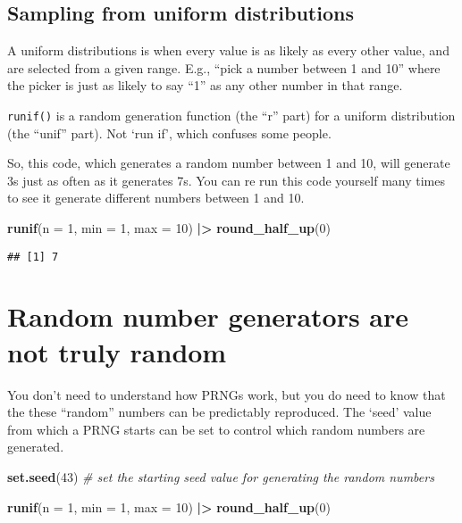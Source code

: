 \documentclass[
]{article}
\newenvironment{Shaded}{\begin{snugshade}}{\end{snugshade}}
\newcommand{\AttributeTok}[1]{\textcolor[rgb]{0.13,0.29,0.53}{#1}}
\newcommand{\CommentTok}[1]{\textcolor[rgb]{0.56,0.35,0.01}{\textit{#1}}}
\newcommand{\DecValTok}[1]{\textcolor[rgb]{0.00,0.00,0.81}{#1}}
\newcommand{\FunctionTok}[1]{\textcolor[rgb]{0.13,0.29,0.53}{\textbf{#1}}}
\newcommand{\NormalTok}[1]{#1}
\newcommand{\SpecialCharTok}[1]{\textcolor[rgb]{0.81,0.36,0.00}{\textbf{#1}}}
\begin{document}
\hypertarget{sampling-from-uniform-distributions}{%
\subsection{Sampling from uniform
distributions}\label{sampling-from-uniform-distributions}}

A uniform distributions is when every value is as likely as every other
value, and are selected from a given range. E.g., ``pick a number
between 1 and 10'' where the picker is just as likely to say ``1'' as
any other number in that range.

\texttt{runif()} is a random generation function (the ``r'' part) for a
uniform distribution (the ``unif'' part). Not `run if', which confuses
some people.

So, this code, which generates a random number between 1 and 10, will
generate 3s just as often as it generates 7s. You can re run this code
yourself many times to see it generate different numbers between 1 and
10.

\begin{Shaded}
\begin{Highlighting}[]
\FunctionTok{runif}\NormalTok{(}\AttributeTok{n =} \DecValTok{1}\NormalTok{, }
      \AttributeTok{min =} \DecValTok{1}\NormalTok{,}
      \AttributeTok{max =} \DecValTok{10}\NormalTok{) }\SpecialCharTok{|\textgreater{}}
  \FunctionTok{round\_half\_up}\NormalTok{(}\DecValTok{0}\NormalTok{)}
\end{Highlighting}
\end{Shaded}

\begin{verbatim}
## [1] 7
\end{verbatim}

\hypertarget{random-number-generators-are-not-truly-random}{%
\section{Random number generators are not truly
random}\label{random-number-generators-are-not-truly-random}}

You don't need to understand how PRNGs work, but you do need to know
that the these ``random'' numbers can be predictably reproduced. The
`seed' value from which a PRNG starts can be set to control which random
numbers are generated.

\begin{Shaded}
\begin{Highlighting}[]
\FunctionTok{set.seed}\NormalTok{(}\DecValTok{43}\NormalTok{) }\CommentTok{\# set the starting seed value for generating the random numbers}

\FunctionTok{runif}\NormalTok{(}\AttributeTok{n =} \DecValTok{1}\NormalTok{, }
      \AttributeTok{min =} \DecValTok{1}\NormalTok{,}
      \AttributeTok{max =} \DecValTok{10}\NormalTok{) }\SpecialCharTok{|\textgreater{}}
  \FunctionTok{round\_half\_up}\NormalTok{(}\DecValTok{0}\NormalTok{)}
\end{Highlighting}
\end{Shaded}
\end{document}
